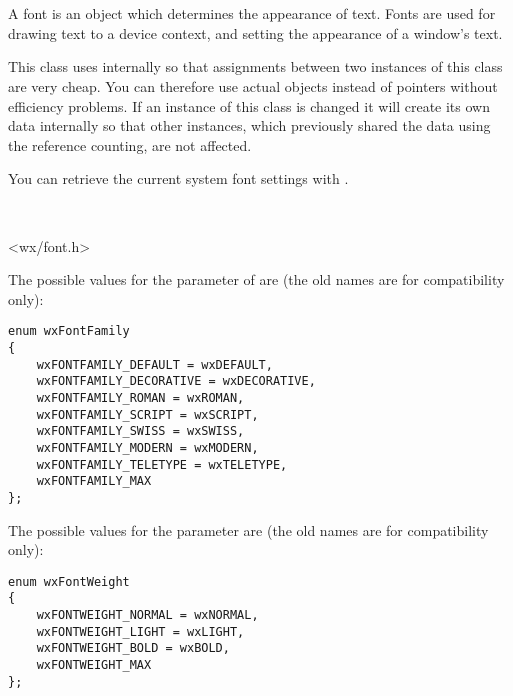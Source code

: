 \section{}\label{wxfont}

A font is an object which determines the appearance of text. Fonts are
used for drawing text to a device context, and setting the appearance of
a window's text.

This class uses 
internally so that assignments between two instances of this class are very
cheap. You can therefore use actual objects instead of pointers without
efficiency problems. If an instance of this class is changed it will create
its own data internally so that other instances, which previously shared the
data using the reference counting, are not affected.

You can retrieve the current system font settings with .



\\


<wx/font.h>


The possible values for the  parameter of  are (the old names are for compatibility only):

\begin{verbatim}
enum wxFontFamily
{
    wxFONTFAMILY_DEFAULT = wxDEFAULT,
    wxFONTFAMILY_DECORATIVE = wxDECORATIVE,
    wxFONTFAMILY_ROMAN = wxROMAN,
    wxFONTFAMILY_SCRIPT = wxSCRIPT,
    wxFONTFAMILY_SWISS = wxSWISS,
    wxFONTFAMILY_MODERN = wxMODERN,
    wxFONTFAMILY_TELETYPE = wxTELETYPE,
    wxFONTFAMILY_MAX
};
\end{verbatim}

The possible values for the  parameter are (the old names
are for compatibility only):

\begin{verbatim}
enum wxFontWeight
{
    wxFONTWEIGHT_NORMAL = wxNORMAL,
    wxFONTWEIGHT_LIGHT = wxLIGHT,
    wxFONTWEIGHT_BOLD = wxBOLD,
    wxFONTWEIGHT_MAX
};
\end{verbatim}

